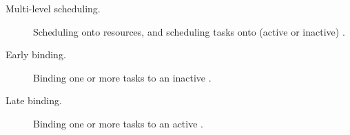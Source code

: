 \documentclass{sig-alternate}
\begin{document}
\begin{description}

\item[Multi-level scheduling.] Scheduling \pilots onto resources, and
scheduling tasks onto (active or inactive) \pilots.

\item[Early binding.] Binding one or more tasks to an inactive \pilot.

\item[Late binding.] Binding one or more tasks to an active \pilot.

\end{description}


\end{document}
